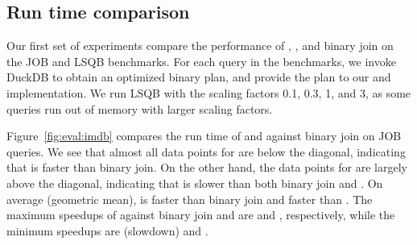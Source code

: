 


\subsection{Run time comparison}\label{sec:run-time-comparison}
Our first set of experiments compare the performance of \FJ, \GJ, and binary join
on the JOB and LSQB benchmarks.
For each query in the benchmarks, we invoke DuckDB to obtain an optimized binary plan,
and provide the plan to our \FJ and \GJ implementation.
We run LSQB with the scaling factors 0.1, 0.3, 1, and 3,
as some queries run out of memory with larger scaling factors.

Figure~\ref{fig:eval:imdb} compares the run time of \FJ and \GJ against binary join on JOB queries.
We see that almost all data points for \FJ are below the diagonal,
indicating that \FJ is faster than binary join.
On the other hand, the data points for \GJ are largely above the diagonal,
indicating that \GJ is slower than both binary join and \FJ.
On average (geometric mean), \FJ is \imdbavgfjbj faster than binary join
and \imdbavgfjgj faster than \GJ.
The maximum speedups of \FJ against binary join and \GJ
are \imdbmaxfjbj and \imdbmaxfjgj, respectively,
while the minimum speedups are \imdbminfjbj (\imdbmaxbjfj slowdown) and \imdbminfjgj.

